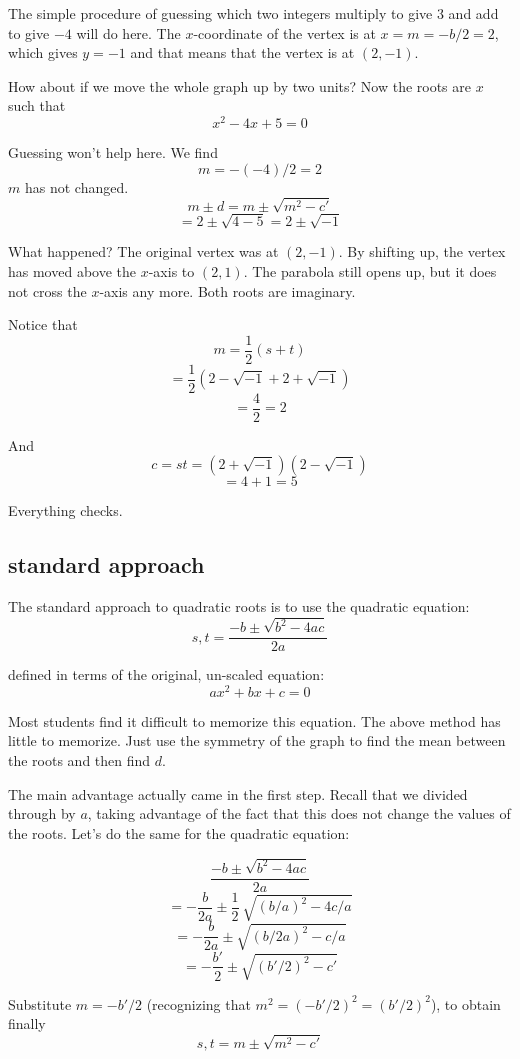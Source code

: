 \documentclass[11pt, oneside]{article}
\begin{document}
The simple procedure of guessing which two integers multiply to give $3$ and add to give $-4$ will do here.  The $x$-coordinate of the vertex is at $x = m = -b/2 = 2$, which gives $y = -1$ and that means that the vertex is at $(2,-1)$.

How about if we move the whole graph up by two units?  Now the roots are $x$ such that
\[ x^2 - 4x + 5 = 0 \]

Guessing won't help here.  We find
\[ m = - (-4)/2 = 2 \]
$m$ has not changed.
\[ m \pm d = m \pm \sqrt{m^2 - c'} \]
\[ = 2 \pm \sqrt{4 - 5} = 2 \pm \sqrt{-1} \]

What happened?  The original vertex was at $(2,-1)$.  By shifting up, the vertex has moved above the $x$-axis to $(2,1)$.  The parabola still opens up, but it does not cross the $x$-axis any more.  Both roots are imaginary.

Notice that
\[ m = \frac{1}{2} (s + t) \]
\[ = \frac{1}{2} (2 - \sqrt{-1} + 2 + \sqrt{-1}) \]
\[ = \frac{4}{2} = 2 \]

And
\[ c = st = (2 + \sqrt{-1})(2 - \sqrt{-1}) \]
\[ = 4 + 1 = 5 \]

Everything checks.

\subsection*{standard approach}

The standard approach to quadratic roots is to use the quadratic equation:
\[ s,t = \frac{-b \pm \sqrt{b^2 - 4ac}}{2a} \]

defined in terms of the original, un-scaled equation:
\[ ax^2 + bx + c = 0 \]

Most students find it difficult to memorize this equation.  The above method has little to memorize.  Just use the symmetry of the graph to find the mean between the roots and then find $d$.

The main advantage actually came in the first step.  Recall that we divided through by $a$, taking advantage of the fact that this does not change the values of the roots.  Let's do the same for the quadratic equation:

\[ \frac{-b \pm \sqrt{b^2 - 4ac}}{2a} \]
\[ = - \frac{b}{2a} \pm \frac{1}{2} \ \sqrt{(b/a)^2 - 4c/a} \]
\[ = - \frac{b}{2a} \pm \sqrt{(b/2a)^2 - c/a} \]
\[ = - \frac{b'}{2} \pm \sqrt{(b'/2)^2 - c'} \]

Substitute $m = -b'/2$ (recognizing that $m^2 = (-b'/2)^2 = (b'/2)^2$), to obtain finally
\[ s,t = m \pm \sqrt{m^2 - c'} \]
\end{document}
